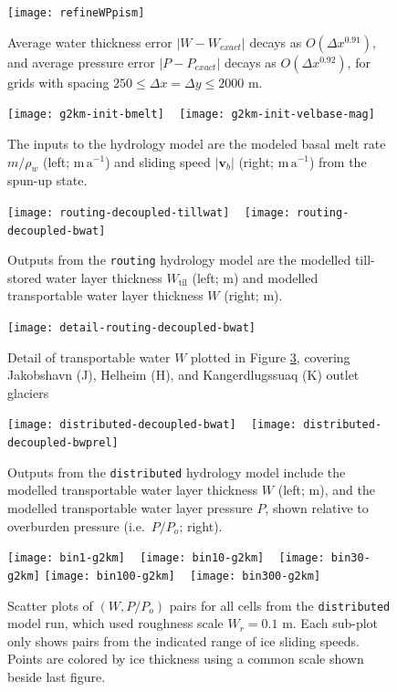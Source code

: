 \documentclass[gmd]{copernicus}   %
\begin{document}
\begin{figure}[ht]
\texttt{[image: refineWPpism]}
\caption{Average water thickness error $|W-W_{exact}|$ decays as $O(\Delta x^{0.91})$, and average pressure error $|P-P_{exact}|$ decays as $O(\Delta x^{0.92})$, for grids with spacing $250 \le \Delta x = \Delta y \le 2000$ m.}
\label{fig:refineWPpism}
\end{figure}

\newcommand{\grnht}{3.4in}

\begin{figure}[ht]
\mbox{\texttt{[image: g2km-init-bmelt]} \,
\texttt{[image: g2km-init-velbase-mag]}}
\caption{The inputs to the hydrology model are the modeled basal melt rate $m/\rho_w$ (left; $\mathrm{m}\,\mathrm{a}^{-1}$) and sliding speed $|\mathbf{v}_b|$ (right; $\mathrm{m}\,\mathrm{a}^{-1}$) from the spun-up state.}
\label{fig:Greenhydroinputs}
\end{figure}

\begin{figure}[ht]
\mbox{\texttt{[image: routing-decoupled-tillwat]} \,
\texttt{[image: routing-decoupled-bwat]}}
\caption{Outputs from the \texttt{routing} hydrology model are the modelled till-stored water layer thickness $W_{\text{til}}$ (left; $\mathrm{m}$) and modelled transportable water layer thickness $W$ (right; $\mathrm{m}$).}
\label{fig:Greenroutingresults}
\end{figure}

\begin{figure}[ht]
\texttt{[image: detail-routing-decoupled-bwat]}
\caption{Detail of transportable water $W$ plotted in Figure \ref{fig:Greenroutingresults}, covering Jakobshavn (J), Helheim (H), and Kangerdlugssuaq (K) outlet glaciers}
\label{fig:Greenroutingdetail}
\end{figure}

\begin{figure}[ht]
\mbox{\texttt{[image: distributed-decoupled-bwat]} \,
\texttt{[image: distributed-decoupled-bwprel]}}
\caption{Outputs from the \texttt{distributed} hydrology model include the modelled transportable water layer thickness $W$ (left; $\mathrm{m}$), and the modelled transportable water layer pressure $P$, shown relative to overburden pressure (i.e.~$P/P_o$; right).}
\label{fig:Greendistributedresults}
\end{figure}

\newcommand{\myheight}{1.8in}
\begin{figure}[ht]
\mbox{\texttt{[image: bin1-g2km]} \, \texttt{[image: bin10-g2km]} \, \texttt{[image: bin30-g2km]}}
\mbox{\texttt{[image: bin100-g2km]} \,
\texttt{[image: bin300-g2km]}}
\caption{Scatter plots of $(W,P/P_o)$ pairs for all cells from the \texttt{distributed} model run, which used roughness scale $W_r = 0.1$ m.  Each sub-plot only shows pairs from the indicated range of ice sliding speeds.  Points are colored by ice thickness using a common scale shown beside last figure.}
\label{fig:GreenisPofW}
\end{figure}
\end{document}
